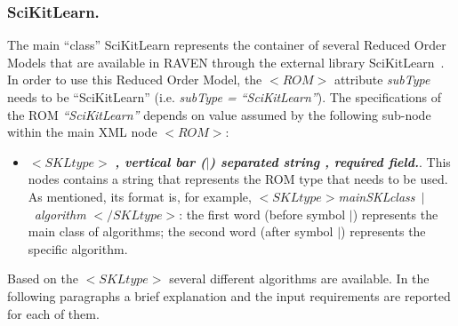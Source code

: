 \subsubsection{SciKitLearn.}
\label{subsubsec:SciKitLearn}
The main ``class'' SciKitLearn represents the container of several Reduced Order Models that are available in RAVEN through the external library SciKitLearn~\cite{SciKitLearn}.
\\In order to use this Reduced Order Model, the $<ROM>$ attribute \textit{subType} needs to be ``SciKitLearn'' (i.e. \textit{subType = ``SciKitLearn''}). The specifications of the ROM \textit{``SciKitLearn''} depends on value assumed by the following sub-node within the main XML node $<ROM>$:
\begin{itemize}
\item $<SKLtype>$ \textbf{\textit{, vertical bar ($\vert$) separated string , required field.}}. This nodes contains a string that represents the ROM type that needs to be used. As mentioned, its format is, for example, $<SKLtype>$\textit{mainSKLclass}~$\vert$~\textit{algorithm} $</SKLtype>$: the first word (before symbol $\vert$) represents the main class of algorithms; the second word (after symbol $\vert$) represents the specific algorithm.
\end{itemize}
Based on the $<SKLtype>$ several different algorithms are available. In the following paragraphs a brief explanation and the input requirements are reported for each of them.
